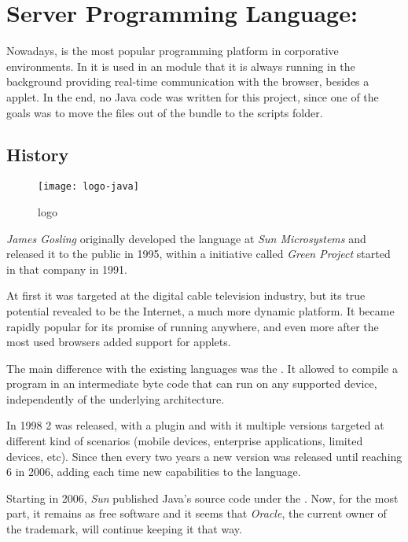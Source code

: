 \section{Server Programming Language: } %
\label{sec:java}

Nowadays,  is the most popular programming platform in corporative environments.
In  it is used in an  module that it is always running in the background providing real-time communication with the browser, besides a  applet.
In the end, no Java code was written for this project, since one of the goals was to move the files out of the  bundle to the  scripts folder.

\subsection{History} %
\label{sub:javahistory}

\begin{wrapfigure}{r}{0.5\textwidth}
  \centering
    \texttt{[image: logo-java]}
  \caption{ logo}
  \label{fig:logo-java}
\end{wrapfigure}

\emph{James Gosling} originally developed the language at \emph{Sun Microsystems} and released it to the public in 1995, within a initiative called \emph{Green Project} started in that company in 1991.

At first it was targeted at the digital cable television industry, but its true potential revealed to be the Internet, a much more dynamic platform.
It became rapidly popular for its promise of running anywhere, and even more after the most used browsers added support for  applets.

The main difference with the existing languages was the .
It allowed to compile a program in an intermediate byte code that can run on any  supported device, independently of the underlying architecture.

In 1998  2 was released, with a  plugin and with it multiple versions targeted at different kind of scenarios (mobile devices, enterprise applications, limited devices, etc).
Since then every two years a new version was released until reaching  6 in 2006, adding each time new capabilities to the language.

Starting in 2006, \emph{Sun} published Java's source code under the . Now, for the most part, it remains as free software and it seems that \emph{Oracle}, the current owner of the trademark, will continue keeping it that way.

